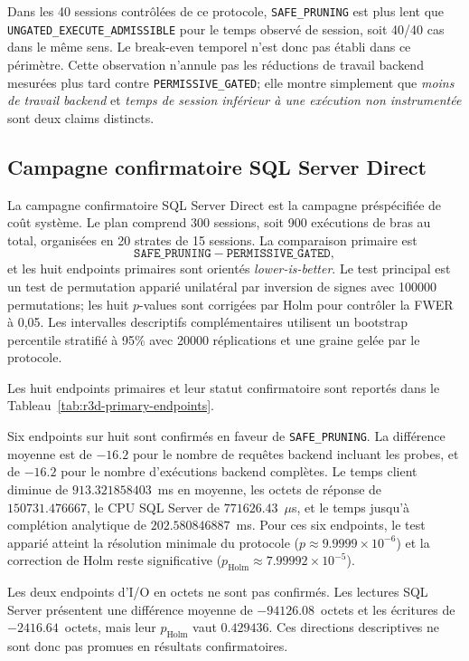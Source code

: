 \documentclass[journal]{IEEEtran}
\begin{document}
Dans les 40 sessions contrôlées de ce protocole, \texttt{SAFE\_PRUNING} est plus lent que \texttt{UNGATED\_EXECUTE\_ADMISSIBLE} pour le temps observé de session, soit 40/40 cas dans le même sens. Le break-even temporel n'est donc pas établi dans ce périmètre. Cette observation n'annule pas les réductions de travail backend mesurées plus tard contre \texttt{PERMISSIVE\_GATED}; elle montre simplement que \emph{moins de travail backend} et \emph{temps de session inférieur à une exécution non instrumentée} sont deux claims distincts.

\subsection{Campagne confirmatoire SQL Server Direct}

La campagne confirmatoire SQL Server Direct est la campagne préspécifiée de coût système. Le plan comprend 300 sessions, soit 900 exécutions de bras au total, organisées en 20 strates de 15 sessions. La comparaison primaire est
\[
\texttt{SAFE\_PRUNING}-\texttt{PERMISSIVE\_GATED},
\]
et les huit endpoints primaires sont orientés \emph{lower-is-better}. Le test principal est un test de permutation apparié unilatéral par inversion de signes avec 100000 permutations; les huit $p$-values sont corrigées par Holm pour contrôler la FWER à 0,05. Les intervalles descriptifs complémentaires utilisent un bootstrap percentile stratifié à 95\% avec 20000 réplications et une graine gelée par le protocole.

Les huit endpoints primaires et leur statut confirmatoire sont reportés dans le Tableau~\ref{tab:r3d-primary-endpoints}.



Six endpoints sur huit sont confirmés en faveur de \texttt{SAFE\_PRUNING}. La différence moyenne est de $-16.2$ pour le nombre de requêtes backend incluant les probes, et de $-16.2$ pour le nombre d'exécutions backend complètes. Le temps client diminue de $913.321858403$~ms en moyenne, les octets de réponse de $150731.476667$, le CPU SQL Server de $771626.43$~$\mu$s, et le temps jusqu'à complétion analytique de $202.580846887$~ms. Pour ces six endpoints, le test apparié atteint la résolution minimale du protocole ($p\approx 9.9999\times 10^{-6}$) et la correction de Holm reste significative ($p_{\mathrm{Holm}}\approx 7.99992\times 10^{-5}$).

Les deux endpoints d'I/O en octets ne sont pas confirmés. Les lectures SQL Server présentent une différence moyenne de $-94126.08$~octets et les écritures de $-2416.64$~octets, mais leur $p_{\mathrm{Holm}}$ vaut $0.429436$. Ces directions descriptives ne sont donc pas promues en résultats confirmatoires.
\end{document}
